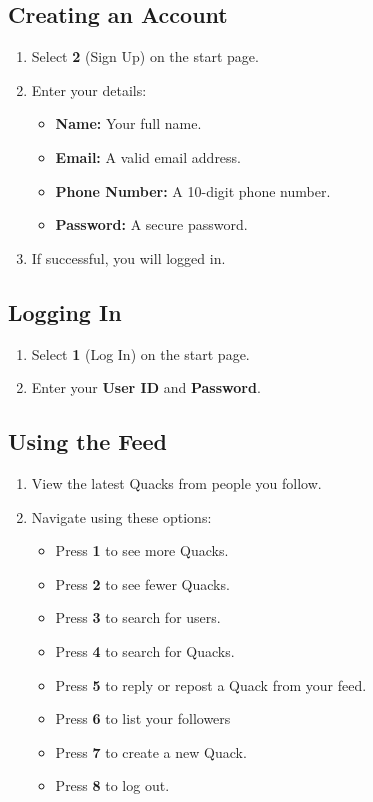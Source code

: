 \documentclass[11pt]{article}
\begin{document}
\subsection*{Creating an Account}
\begin{enumerate}
    \item Select \textbf{2} (Sign Up) on the start page.
    \item Enter your details:
        \begin{itemize}
            \item \textbf{Name:} Your full name.
            \item \textbf{Email:} A valid email address.
            \item \textbf{Phone Number:} A 10-digit phone number.
            \item \textbf{Password:} A secure password.
        \end{itemize}
    \item If successful, you will logged in.
\end{enumerate}

\subsection*{Logging In}
\begin{enumerate}
    \item Select \textbf{1} (Log In) on the start page.
    \item Enter your \textbf{User ID} and \textbf{Password}.
\end{enumerate}

\subsection*{Using the Feed}
\begin{enumerate}
    \item View the latest Quacks from people you follow.
    \item Navigate using these options:
        \begin{itemize}
            \item Press \textbf{1} to see more Quacks.
            \item Press \textbf{2} to see fewer Quacks.
            \item Press \textbf{3} to search for users.
            \item Press \textbf{4} to search for Quacks.
            \item Press \textbf{5} to reply or repost a Quack from your feed.
            \item Press \textbf{6} to list your followers
            \item Press \textbf{7} to create a new Quack.
            \item Press \textbf{8} to log out.
        \end{itemize}
\end{enumerate}
\end{document}
